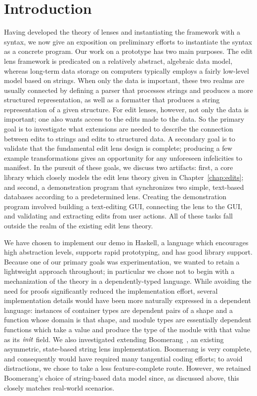 \section{Introduction}
\label{sec:impl-intro}
Having developed the theory of lenses and instantiating the framework with a
syntax, we now give an exposition on preliminary efforts to instantiate the
syntax as a concrete program. Our work on a prototype has two main purposes.
The edit lens framework is predicated on a relatively abstract, algebraic
data model, whereas long-term data storage on computers typically employs a
fairly low-level model based on strings. When only the data is important,
these two realms are usually connected by defining a parser that processes
strings and produces a more structured representation, as well as a
formatter that produces a string representation of a given structure. For
edit lenses, however, not only the data is important; one also wants access
to the edits made to the data. So the primary goal is to investigate what
extensions are needed to describe the connection between edits to strings
and edits to structured data. A secondary goal is to validate that the
fundamental edit lens design is complete; producing a few example
transformations gives an opportunity for any unforeseen infelicities to
manifest. In the pursuit of these goals, we discuss two artifacts: first,
a core library which closely models the edit lens theory given in
Chapter~\ref{chap:edits}; and second, a demonstration program that
synchronizes two simple, text-based databases according to a predetermined
lens. Creating the demonstration program involved building a text-editing
GUI, connecting the lens to the GUI, and validating and extracting edits
from user actions. All of these tasks fall outside the realm of the existing
edit lens theory.

We have chosen to implement our demo in Haskell, a language which encourages
high abstraction levels, supports rapid prototyping, and has good library
support. Because one of our primary goals was experimentation, we wanted to
retain a lightweight approach throughout; in particular we chose not to
begin with a mechanization of the theory in a dependently-typed language.
While avoiding the need for proofs significantly reduced the implementation
effort, several implementation details would have been more naturally
expressed in a dependent language: instances of container types are
dependent pairs of a shape and a function whose domain is that shape, and
module types are essentially dependent functions which take a value and
produce the type of the module with that value as its $\mathit{init}$ field. We
also investigated extending Boomerang~\cite{Boomerang07}, an existing
asymmetric, state-based string lens implementation. Boomerang is very
complete, and consequently would have required many tangential coding
efforts; to avoid distractions, we chose to take a less feature-complete
route. However, we retained Boomerang's choice of string-based data model
since, as discussed above, this closely matches real-world scenarios.


